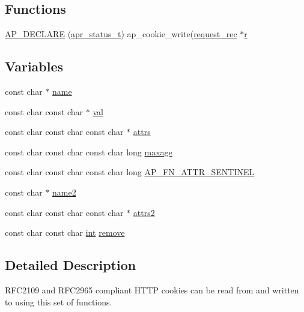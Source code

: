 \subsection*{Functions}
\begin{DoxyCompactItemize}
\item 
\hyperlink{group__APACHE__CORE__COOKIE_gabe7cdd20d5d6ad7a34cd6ce81ea12993}{A\+P\+\_\+\+D\+E\+C\+L\+A\+RE} (\hyperlink{group__apr__errno_gaa5105fa83cc322f09382292db8b47593}{apr\+\_\+status\+\_\+t}) ap\+\_\+cookie\+\_\+write(\hyperlink{structrequest__rec}{request\+\_\+rec} $\ast$\hyperlink{pcregrep_8txt_a2e9e9438b26c0bb4425367a7e4f75eb3}{r}
\end{DoxyCompactItemize}
\subsection*{Variables}
\begin{DoxyCompactItemize}
\item 
const char $\ast$ \hyperlink{group__APACHE__CORE__COOKIE_ga8f8f80d37794cde9472343e4487ba3eb}{name}
\item 
const char const char $\ast$ \hyperlink{group__APACHE__CORE__COOKIE_ga494a86fd24608f89c2e10530c39150f5}{val}
\item 
const char const char const char $\ast$ \hyperlink{group__APACHE__CORE__COOKIE_ga15763078452b250115cbc4984012a3c5}{attrs}
\item 
const char const char const char long \hyperlink{group__APACHE__CORE__COOKIE_ga846f24530366d967942121cbfdca1ea7}{maxage}
\item 
const char const char const char long \hyperlink{group__APACHE__CORE__COOKIE_ga6e3125e186e4a9b2c5f0a405413f249a}{A\+P\+\_\+\+F\+N\+\_\+\+A\+T\+T\+R\+\_\+\+S\+E\+N\+T\+I\+N\+EL}
\item 
const char $\ast$ \hyperlink{group__APACHE__CORE__COOKIE_ga520026d3e8b80c926e6d7728855a244e}{name2}
\item 
const char const char const char $\ast$ \hyperlink{group__APACHE__CORE__COOKIE_gab566f9970f88284796f00db853ab982a}{attrs2}
\item 
const char const char \hyperlink{pcre_8txt_a42dfa4ff673c82d8efe7144098fbc198}{int} \hyperlink{group__APACHE__CORE__COOKIE_ga7ebb94e118f56a4baf4bfe9cc313cf1d}{remove}
\end{DoxyCompactItemize}


\subsection{Detailed Description}
R\+F\+C2109 and R\+F\+C2965 compliant H\+T\+TP cookies can be read from and written to using this set of functions. 

